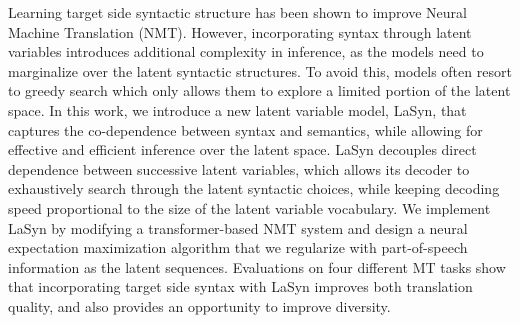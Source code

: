 Learning target side syntactic structure has been shown to improve Neural Machine Translation (NMT). However, incorporating syntax through latent variables introduces additional complexity in inference, as the models need to marginalize over the latent syntactic structures. To avoid this, models often resort to greedy search which only allows them to explore a limited portion of the latent space.
In this work, we introduce a new latent variable model, LaSyn, that captures the co-dependence between syntax and semantics, while allowing for effective and efficient inference over the latent space. LaSyn decouples direct dependence between successive latent variables, which allows its decoder to exhaustively search through the latent syntactic choices, while keeping decoding speed proportional to the size of the latent variable vocabulary. We implement LaSyn by modifying a transformer-based NMT system and design a neural expectation maximization algorithm that we regularize with part-of-speech information as the latent sequences. Evaluations on four different MT tasks show that incorporating target side syntax with LaSyn improves both translation quality, and also provides an opportunity to improve diversity.